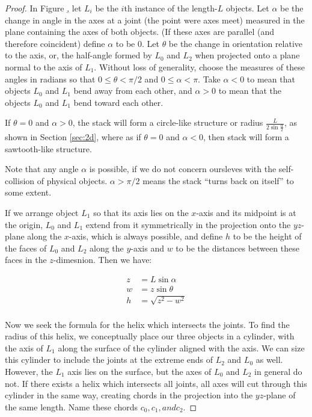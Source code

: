 \documentclass[11pt]{article}
\begin{document}
\begin{proof}

  In Figure \href{fig:prismdiagram}, let $L_i$ be the $i$th instance of the length-$L$ objects. Let $\alpha$ be the
  change in angle in the axes at a joint (the point were axes meet) measured in the plane containing the axes of both objects. (If these axes are parallel (and therefore coincident) define $\alpha$ to be 0.
  Let $\theta$ be the change in orientation relative to the axis,
  or, the half-angle formed by $L_0$ and $L_2$ when projected onto a plane normal to the axis of $L_1$.
  Without loss of generality, choose the measures of these angles in radians so that
  $0 \leq \theta < \pi/2$ and $0 \leq \alpha < \pi$.
  Take $\alpha < 0$ to mean that objects $L_0$ and $L_1$ bend away from each other,
  and $\alpha > 0$ to mean that the objects $L_0$ and $L_1$ bend toward each other.

  If $\theta = 0$ and $\alpha > 0$, the stack will form a circle-like structure or radius 
  $\frac{L}{2 \sin{\frac{\alpha}{2}}}$, as shown in Section \ref{sec:2d}, where as if
  $\theta = 0$ and $\alpha < 0$, then stack will form a sawtooth-like structure.

  Note that any angle $\alpha$ is possible, if we do not concern oursleves with the self-collision
  of physical objects. $\alpha > \pi/2$ means the stack ``turns back on itself'' to some extent.

  If we arrange object $L_1$ so that its axis lies on the $x$-axis and its midpoint is at the origin,
  $L_0$ and $L_1$ extend from it symmetrically in the projection onto the $yz$-plane along the $x$-axis, which is always possible, and define $h$ to be the height of the faces of $L_0$ and $L_2$ along the $y$-axis
  and $w$ to be the distances between these faces in the $z$-dimesnion. Then we have:

  \begin{align*}
z &= L \sin{\alpha} \\
w &= z \sin{\theta} \\
h &= \sqrt{z^2 - w^2} \\
  \end{align*}

  Now we seek the formula for the helix which intersects the joints. To find the radius of this helix,
  we conceptually place our three objects in a cylinder, with the axis of $L_1$ along the surface
  of the cylinder aligned with the axis. We can size this cylinder to include the joints at the
  extreme ends of $L_2$ and $L_0$ as well. However, the $L_1$ axis lies on the surface, but
  the axes of $L_0$ and $L_2$ in general do not. If there exists a helix which intersects all
  joints, all axes will cut through this cylinder in the same way, creating chords in the projection
  into the $yz$-plane of the same length. Name these chords $c_0,c_1, and c_2$.


\end{proof}
\end{document}
